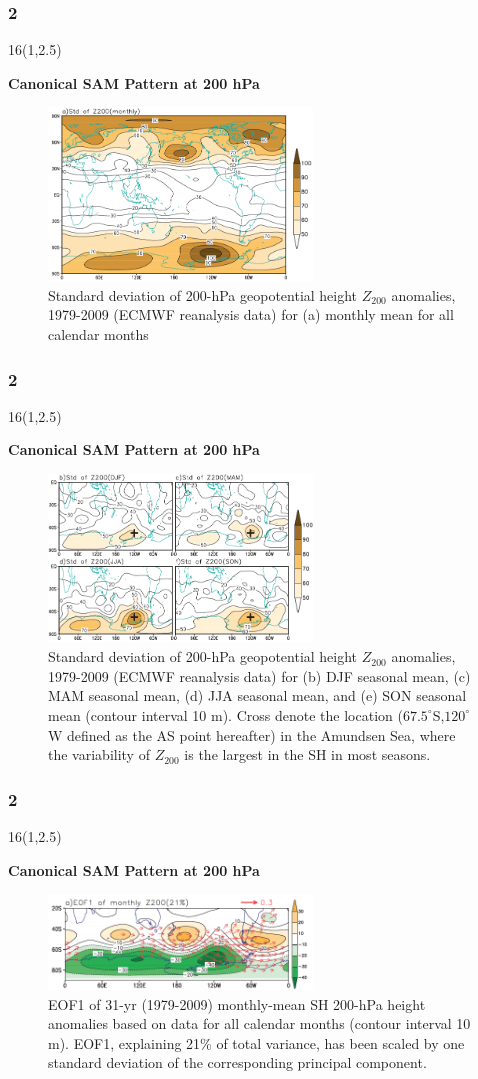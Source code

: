 \documentclass{beamer}
\newcommand\FrameText[1]{
\begin{textblock}{16}(1,2.5)
\raggedright #1
\end{textblock}}
\begin{document}
\begin{frame}
\frametitle{2}
\FrameText{\bf{\large Canonical SAM Pattern at 200 hPa}}
\begin{figure}
\centering
\includegraphics[width=7cm]{1.png}
\caption{\tiny Standard deviation of 200-hPa geopotential height $Z_{200}$ anomalies, 1979-2009 (ECMWF reanalysis data)
for (a) monthly mean for all calendar months}
\label{1}
\end{figure}
\end{frame}

\begin{frame}
\frametitle{2}
\FrameText{\bf{\large Canonical SAM Pattern at 200 hPa}}
\begin{figure}
\centering
\includegraphics[width=7cm]{2.png}
\caption{\tiny Standard deviation of 200-hPa geopotential height $Z_{200}$ anomalies, 1979-2009 (ECMWF reanalysis data)
for (b) DJF seasonal mean, (c) MAM seasonal mean, (d) JJA seasonal
mean, and (e) SON seasonal mean (contour interval 10 m). Cross denote the location ($67.5^{\circ}$S,$120^{\circ}$W defined as the
AS point hereafter) in the Amundsen Sea, where the variability of $Z_{200}$ is the largest in the SH in most seasons.}
\label{2}
\end{figure}
\end{frame}

\begin{frame}
\frametitle{2}
\FrameText{\bf{\large Canonical SAM Pattern at 200 hPa}}
\begin{figure}
\centering
\includegraphics[width=7cm]{3.png}
\caption{\tiny EOF1 of 31-yr (1979-2009) monthly-mean SH 200-hPa height anomalies based on data
for all calendar months (contour interval 10 m). EOF1, explaining 21\%
of total variance, has been scaled by one standard deviation of the corresponding principal component.}
\label{3}
\end{figure}
\end{frame}
\end{document}
